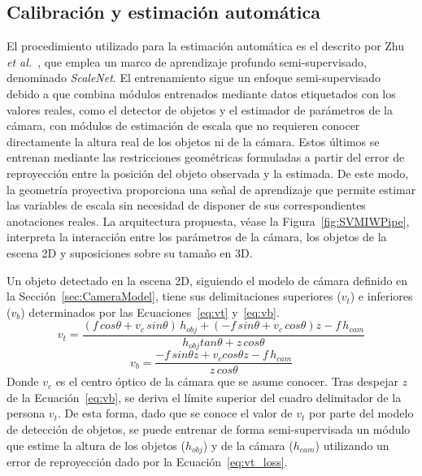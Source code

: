 \subsection{Calibración y estimación automática}\label{sec:AutoMethod}
El procedimiento utilizado para la estimación automática es el descrito por Zhu \emph{et al.}~\cite{SVMIW},
que emplea un marco de aprendizaje profundo semi-supervisado, denominado \emph{ScaleNet}.
El entrenamiento sigue un enfoque semi-supervisado debido a que combina módulos
entrenados mediante datos etiquetados con los valores reales, como el detector de objetos
y el estimador de parámetros de la cámara, con módulos de estimación de escala que
no requieren conocer directamente la altura real de los objetos ni de la cámara.
Estos últimos se entrenan mediante las restricciones geométricas formuladas a partir del
error de reproyección entre la posición del objeto observada y la estimada.
De este modo, la geometría proyectiva proporciona una señal de aprendizaje que permite
estimar las variables de escala sin necesidad de disponer de sus correspondientes
anotaciones reales. La arquitectura propuesta, véase la Figura~\ref{fig:SVMIWPipe},
interpreta la interacción entre los parámetros de la cámara, los objetos de la escena 2D y suposiciones sobre su tamaño en 3D.
\par
Un objeto detectado en la escena 2D, siguiendo el modelo de cámara definido en la Sección~\ref{sec:CameraModel},
tiene sus delimitaciones superiores ($v_t$) e inferiores ($v_b$) determinados por las Ecuaciones~\ref{eq:vt} y~\ref{eq:vb}.
\begin{equation}\label{eq:vt}
    v_t = \frac{(f\, cos\theta + v_c\, sin\theta)\,h_{obj} + (-f\, sin\theta + v_c\, cos\theta)z - f\,h_{cam}}{h_{obj}tan\theta + z\,cos\theta}
\end{equation}
\begin{equation}\label{eq:vb}
  v_b = \frac{-f\,sin\theta z + v_c cos\theta z - f\,h_{cam}}{z\, cos\theta}
\end{equation}
Donde $v_c$ es el centro óptico de la cámara que se asume conocer. Tras despejar
$z$ de la Ecuación~\ref{eq:vb}, se deriva el límite superior del
cuadro delimitador de la persona $v_t$. De esta forma, dado que se conoce el valor de $v_t$
por parte del modelo de detección de objetos, se puede entrenar de forma semi-supervisada
un módulo que estime la altura de los objetos ($h_{obj}$) y de la cámara ($h_{cam}$) utilizando un error de
reproyección dado por la Ecuación~\ref{eq:vt_loss}.
